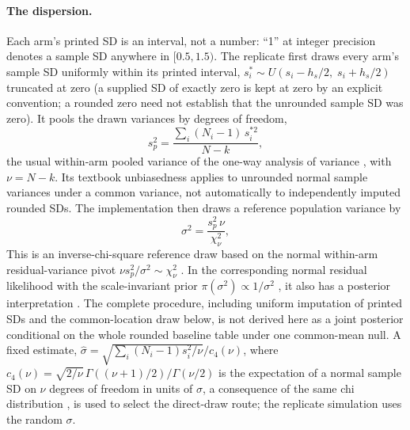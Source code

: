 \documentclass[11pt,a4paper]{article}
\begin{document}
\paragraph{The dispersion.} Each arm's printed SD is an interval, not a number: ``1'' at integer precision denotes a sample SD anywhere in $[0.5, 1.5)$. The replicate first draws every arm's sample SD uniformly within its printed interval, $s_i^{*} \sim U(s_i - h_s/2,\; s_i + h_s/2)$ truncated at zero (a supplied SD of exactly zero is kept at zero by an explicit convention; a rounded zero need not establish that the unrounded sample SD was zero). It pools the drawn variances by degrees of freedom,
\begin{equation}
s_p^{2} = \frac{\sum_i (N_i - 1)\, s_i^{*2}}{N - k},
\end{equation}
the usual within-arm pooled variance of the one-way analysis of variance \citep{fisher1925}, with $\nu=N-k$. Its textbook unbiasedness applies to unrounded normal sample variances under a common variance, not automatically to independently imputed rounded SDs. The implementation then draws a reference population variance by
\begin{equation}
\sigma^{2} = \frac{s_p^{2}\,\nu}{\chi^{2}_{\nu}},
\label{eq:sigma}
\end{equation}
This is an inverse-chi-square reference draw based on the normal within-arm residual-variance pivot $\nu s_p^2/\sigma^2\sim\chi^2_\nu$ \citep{helmert1876,johnson1970}. In the corresponding normal residual likelihood with the scale-invariant prior $\pi(\sigma^2)\propto1/\sigma^2$ \citep{jeffreys1961}, it also has a posterior interpretation \citep{gelman2013}. The complete procedure, including uniform imputation of printed SDs and the common-location draw below, is not derived here as a joint posterior conditional on the whole rounded baseline table under one common-mean null. A fixed estimate, $\widehat\sigma=\sqrt{\sum_i(N_i-1)s_i^2/\nu}/c_4(\nu)$, where $c_4(\nu)=\sqrt{2/\nu}\,\Gamma((\nu+1)/2)/\Gamma(\nu/2)$ is the expectation of a normal sample SD on $\nu$ degrees of freedom in units of $\sigma$, a consequence of the same chi distribution \citep{helmert1876}, is used to select the direct-draw route; the replicate simulation uses the random $\sigma$.
\end{document}
